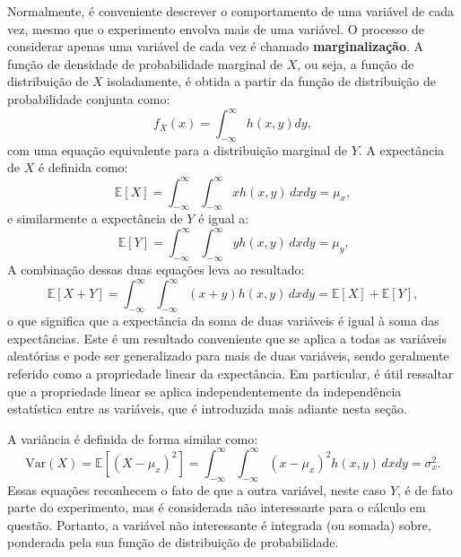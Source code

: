 Normalmente, é conveniente descrever o comportamento de uma variável de cada vez, mesmo que o experimento envolva mais de uma variável. O processo de considerar apenas uma variável de cada vez é chamado \textbf{marginalização}. A função de densidade de probabilidade marginal de $X$, ou seja, a função de distribuição de $X$ isoladamente, é obtida a partir da função de distribuição de probabilidade conjunta como:
\begin{equation}\label{2.15}
f_X(x) = \int_{-\infty}^{\infty} h(x,y) dy,
\end{equation}
com uma equação equivalente para a distribuição marginal de $Y$. A expectância de $X$ é definida como:
\begin{equation}
\mathbb{E}[X] = \int_{-\infty}^{\infty}\int_{-\infty}^{\infty} xh(x,y)\,dxdy = \mu_x,
\end{equation}
e similarmente a expectância de $Y$ é igual a:
\begin{equation*}
	\mathbb{E}[Y] = \int_{-\infty}^{\infty}\int_{-\infty}^{\infty} yh(x,y)\,dxdy = \mu_y.
\end{equation*}
A combinação dessas duas equações leva ao resultado:
\begin{equation*}
	\mathbb{E}[X + Y] = \int_{-\infty}^{\infty}\int_{-\infty}^{\infty} (x + y)h(x,y)\,dxdy = \mathbb{E}[X] + \mathbb{E}[Y],
\end{equation*}
o que significa que a expectância da soma de duas variáveis é igual à soma das expectâncias. Este é um resultado conveniente que se aplica a todas as variáveis aleatórias e pode ser generalizado para mais de duas variáveis, sendo geralmente referido como a propriedade linear da expectância. Em particular, é útil ressaltar que a propriedade linear se aplica independentemente da independência estatística entre as variáveis, que é introduzida mais adiante nesta seção.

A variância é definida de forma similar como:
\begin{equation}
\text{Var}(X) = \mathbb{E}[(X - \mu_x)^2] = \int_{-\infty}^{\infty}\int_{-\infty}^{\infty} (x - \mu_x)^2 h(x, y)\, dxdy = \sigma_x^2.
\end{equation}
Essas equações reconhecem o fato de que a outra variável, neste caso $Y$, é de fato parte do experimento, mas é considerada não interessante para o cálculo em questão. Portanto, a variável não interessante é integrada (ou somada) sobre, ponderada pela sua função de distribuição de probabilidade.

